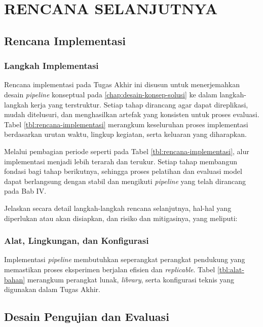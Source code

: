 
\chapter{RENCANA SELANJUTNYA}
\label{chap:rencana-selanjutnya}

\section{Rencana Implementasi}
\subsection{Langkah Implementasi}
Rencana implementasi pada Tugas Akhir ini disusun untuk menerjemahkan desain \textit{\textit{pipeline}} konseptual pada \ref{chap:desain-konsep-solusi} ke dalam langkah-langkah kerja yang terstruktur. Setiap tahap dirancang agar dapat direplikasi, mudah ditelusuri, dan menghasilkan artefak yang konsisten untuk proses evaluasi. Tabel \ref{tbl:rencana-implementasi} merangkum keseluruhan proses implementasi berdasarkan urutan waktu, lingkup kegiatan, serta keluaran yang diharapkan.



Melalui pembagian periode seperti pada Tabel \ref{tbl:rencana-implementasi}, alur implementasi menjadi lebih terarah dan terukur. Setiap tahap membangun fondasi bagi tahap berikutnya, sehingga proses pelatihan dan evaluasi model dapat berlangsung dengan stabil dan mengikuti \textit{pipeline} yang telah dirancang pada Bab IV.

Jelaskan secara detail langkah-langkah rencana selanjutnya, hal-hal yang diperlukan atau akan disiapkan, dan risiko dan mitigasinya, yang meliputi:

\subsection{Alat, Lingkungan, dan Konfigurasi}
Implementasi \textit{pipeline} membutuhkan seperangkat perangkat pendukung yang memastikan proses eksperimen berjalan efisien dan \textit{replicable}. Tabel \ref{tbl:alat-bahan} merangkum perangkat lunak, \textit{library}, serta konfigurasi teknis yang digunakan dalam Tugas Akhir.



\section{Desain Pengujian dan Evaluasi}

